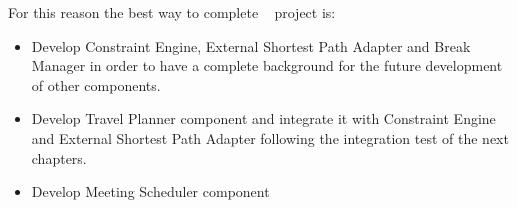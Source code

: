 For this reason the best way to complete \projectname~ project is:
\begin{itemize}
	\item Develop Constraint Engine, External Shortest Path Adapter and Break Manager in order to have a complete background for the future development of other components.
	\item Develop Travel Planner component and integrate it with Constraint Engine and External Shortest Path Adapter following the integration test of the next chapters.
	\item Develop Meeting Scheduler component 
\end{itemize}

\clearpage